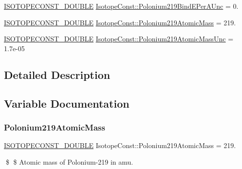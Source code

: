 \begin{DoxyCompactItemize}
\mbox{\hyperlink{group___isotope_const-_macros_ga8f45a7272ce02c0b4c65c44636ed719a}{I\+S\+O\+T\+O\+P\+E\+C\+O\+N\+S\+T\+\_\+\+D\+O\+U\+B\+LE}} \mbox{\hyperlink{group___isotope_const-_polonium-_po219_gab9a3b912b3d262c12791ba10b2d60dba}{Isotope\+Const\+::\+Polonium219\+Bind\+E\+Per\+A\+Unc}} = 0.
\item 
\mbox{\hyperlink{group___isotope_const-_macros_ga8f45a7272ce02c0b4c65c44636ed719a}{I\+S\+O\+T\+O\+P\+E\+C\+O\+N\+S\+T\+\_\+\+D\+O\+U\+B\+LE}} \mbox{\hyperlink{group___isotope_const-_polonium-_po219_gac703aa6d1b0d9919ca0ecab2cf0b1c94}{Isotope\+Const\+::\+Polonium219\+Atomic\+Mass}} = 219.
\item 
\mbox{\hyperlink{group___isotope_const-_macros_ga8f45a7272ce02c0b4c65c44636ed719a}{I\+S\+O\+T\+O\+P\+E\+C\+O\+N\+S\+T\+\_\+\+D\+O\+U\+B\+LE}} \mbox{\hyperlink{group___isotope_const-_polonium-_po219_gac1e071ebc86891b1cda4fbe23293a80c}{Isotope\+Const\+::\+Polonium219\+Atomic\+Mass\+Unc}} = 1.\+7e-\/05
\end{DoxyCompactItemize}


\subsection{Detailed Description}


\subsection{Variable Documentation}
\mbox{\label{group___isotope_const-_polonium-_po219_gac703aa6d1b0d9919ca0ecab2cf0b1c94}} 
\subsubsection{\texorpdfstring{Polonium219\+Atomic\+Mass}{Polonium219AtomicMass}}
{\footnotesize\ttfamily \mbox{\hyperlink{group___isotope_const-_macros_ga8f45a7272ce02c0b4c65c44636ed719a}{I\+S\+O\+T\+O\+P\+E\+C\+O\+N\+S\+T\+\_\+\+D\+O\+U\+B\+LE}} Isotope\+Const\+::\+Polonium219\+Atomic\+Mass = 219.}

\$ \$ Atomic mass of Polonium-\/219 in amu. \mbox{\label{group___isotope_const-_polonium-_po219_gac1e071ebc86891b1cda4fbe23293a80c}} 
